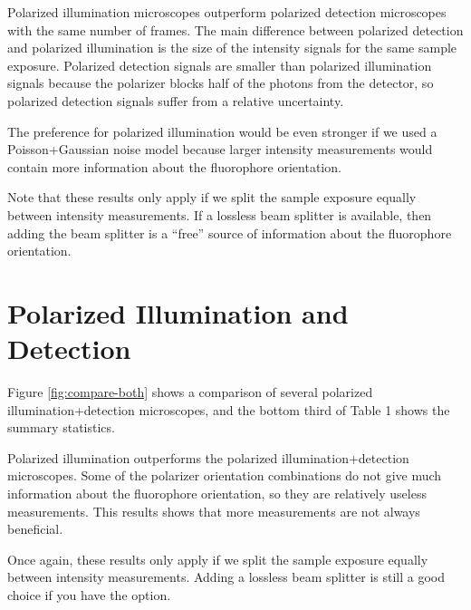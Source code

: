 \documentclass[11pt]{article}
\begin{document}
Polarized illumination microscopes outperform polarized detection microscopes
with the same number of frames. The main difference between polarized detection
and polarized illumination is the size of the intensity signals for the same
sample exposure. Polarized detection signals are smaller than polarized
illumination signals because the polarizer blocks half of the photons from the
detector, so polarized detection signals suffer from a relative uncertainty.

The preference for polarized illumination would be even stronger if we used a
Poisson+Gaussian noise model because larger intensity measurements would contain
more information about the fluorophore orientation.

Note that these results only apply if we split the sample exposure equally
between intensity measurements. If a lossless beam splitter is available, then
adding the beam splitter is a ``free'' source of information about the
fluorophore orientation.

\section{Polarized Illumination and Detection}
Figure \ref{fig:compare-both} shows a comparison of several polarized
illumination+detection microscopes, and the bottom third of Table
1 shows the summary statistics.

Polarized illumination outperforms the polarized illumination+detection
microscopes. Some of the polarizer orientation combinations do not give much
information about the fluorophore orientation, so they are relatively useless
measurements. This results shows that more measurements are not always
beneficial.

Once again, these results only apply if we split the sample exposure equally
between intensity measurements. Adding a lossless beam splitter is still a good
choice if you have the option.
\end{document}
